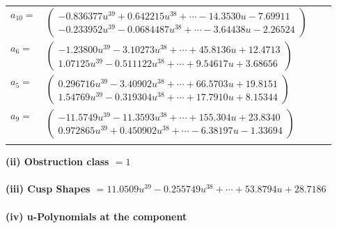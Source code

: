 \documentclass[1p]{elsarticle_modified}
\theoremstyle{definition}
\begin{document}
\begin{tabular}{m{7pt} m{180pt} m{7pt} m{180pt} }
\flushright $a_{10}=$&$\begin{pmatrix}-0.836377 u^{39}+0.642215 u^{38}+\cdots-14.3530 u-7.69911\\-0.233952 u^{39}-0.0684487 u^{38}+\cdots-3.64438 u-2.26524\end{pmatrix}$ \\
\flushright $a_{6}=$&$\begin{pmatrix}-1.23800 u^{39}-3.10273 u^{38}+\cdots+45.8136 u+12.4713\\1.07125 u^{39}-0.511122 u^{38}+\cdots+9.54617 u+3.68656\end{pmatrix}$ \\
\flushright $a_{5}=$&$\begin{pmatrix}0.296716 u^{39}-3.40902 u^{38}+\cdots+66.5703 u+19.8151\\1.54769 u^{39}-0.319304 u^{38}+\cdots+17.7910 u+8.15344\end{pmatrix}$ \\
\flushright $a_{9}=$&$\begin{pmatrix}-11.5749 u^{39}-11.3593 u^{38}+\cdots+155.304 u+23.8340\\0.972865 u^{39}+0.450902 u^{38}+\cdots-6.38197 u-1.33694\end{pmatrix}$\\&\end{tabular}
\flushleft \textbf{(ii) Obstruction class $= 1$}\\~\\
\flushleft \textbf{(iii) Cusp Shapes $= 11.0509 u^{39}-0.255749 u^{38}+\cdots+53.8794 u+28.7186$}\\~\\
\newpage\renewcommand{\arraystretch}{1}
\flushleft \textbf{(iv) u-Polynomials at the component}\newline \\
\end{document}

